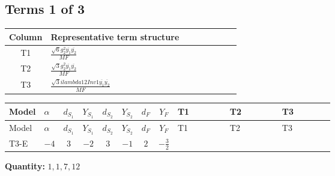 \documentclass[8pt]{article}
\begin{document}
\begin{landscape}
\subsection*{Terms 1 of 3}
\begin{center}
\begin{tabular}{@{}c >{\raggedright\arraybackslash}p{0.82\linewidth}@{}}
\toprule
Column & Representative term structure \\
\midrule
T1 & \(\displaystyle \frac{\sqrt{6} g_{2}^{2} \overline{y_{1}} \overline{y_{2}}}{MF}\) \\
\midrule
T2 & \(\displaystyle \frac{\sqrt{3} g_{2}^{2} \overline{y_{1}} \overline{y_{2}}}{MF}\) \\
\midrule
T3 & \(\displaystyle \frac{\sqrt{3} i lambda12Inv1 \overline{y_{1}} \overline{y_{2}}}{MF}\) \\
\midrule
\bottomrule
\end{tabular}
\end{center}
\smallskip
\tiny
\begin{longtable}{@{}llcccccc >{\raggedright\arraybackslash}p{0.21\linewidth} >{\raggedright\arraybackslash}p{0.21\linewidth} >{\raggedright\arraybackslash}p{0.21\linewidth}@{}}
\toprule
Model & $\alpha$ & $d_{S_1}$ & $Y_{S_1}$ & $d_{S_2}$ & $Y_{S_2}$ & $d_F$ & $Y_F$ & T1 & T2 & T3 \\
\midrule
\endfirsthead
\toprule
Model & $\alpha$ & $d_{S_1}$ & $Y_{S_1}$ & $d_{S_2}$ & $Y_{S_2}$ & $d_F$ & $Y_F$ & T1 & T2 & T3 \\
\midrule
\endhead
T3-E & $-4$ & $3$ & $-2$ & $3$ & $-1$ & $2$ & $-\frac{3}{2}$ & \scriptsize\adjustbox{max width=\linewidth}{$\begin{gathered} - \frac{\sqrt{6} g_{2}^{2} \overline{y_{1}} \overline{y_{2}}}{3 MF}\end{gathered}$} & \scriptsize\adjustbox{max width=\linewidth}{$\begin{gathered} - \frac{\sqrt{3} g_{2}^{2} \overline{y_{1}} \overline{y_{2}}}{6 MF}\end{gathered}$} & \scriptsize\adjustbox{max width=\linewidth}{$\begin{gathered} - \frac{\sqrt{3} i lambda12Inv1 \overline{y_{1}} \overline{y_{2}}}{6 MF}\end{gathered}$} \\
\midrule
\bottomrule
\end{longtable}
\clearpage
\noindent\textbf{Quantity: }$\mathrm{1,1,7,12}$\par\smallskip

\end{landscape}
\end{document}
